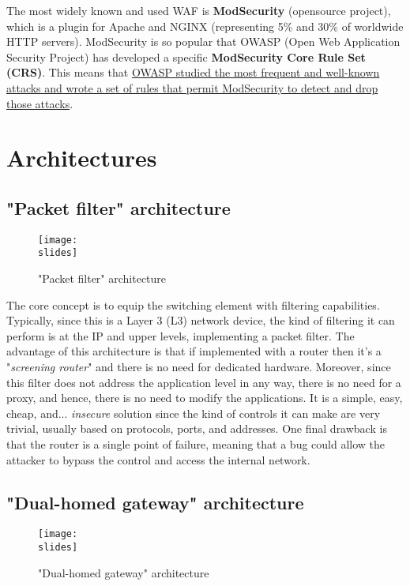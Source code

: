 The most widely known and used WAF is \textbf{ModSecurity} (opensource project), which is a plugin for Apache and NGINX (representing 5\% and 30\% of worldwide HTTP servers). ModSecurity is so popular that OWASP (Open Web Application Security Project) has developed a specific \textbf{ModSecurity Core Rule Set} \textbf{(CRS)}. This means that \ul{OWASP studied the most frequent and well-known attacks and wrote a set of rules that permit ModSecurity to detect and drop those attacks}.


\section{Architectures}

\subsection{"Packet filter" architecture}

\begin{figure}[h]
    \centering
    \texttt{[image: \\slides]}
    \caption{"Packet filter" architecture}
\end{figure}

The core concept is to equip the switching element with filtering capabilities. Typically, since this is a Layer 3 (L3) network device, the kind of filtering it can perform is at the IP and upper levels, implementing a packet filter. The advantage of this architecture is that if implemented with a router then it's a "\textit{screening router}" and there is no need for dedicated hardware. Moreover, since this filter does not address the application level in any way, there is no need for a proxy, and hence, there is no need to modify the applications. It is a simple, easy, cheap, and... \textit{insecure} solution since the kind of controls it can make are very trivial, usually based on protocols, ports, and addresses. One final drawback is that the router is a single point of failure, meaning that a bug could allow the attacker to bypass the control and access the internal network.

\subsection{"Dual-homed gateway" architecture}

\begin{figure}[h]
    \centering
    \texttt{[image: \\slides]}
    \caption{"Dual-homed gateway" architecture}
\end{figure}

